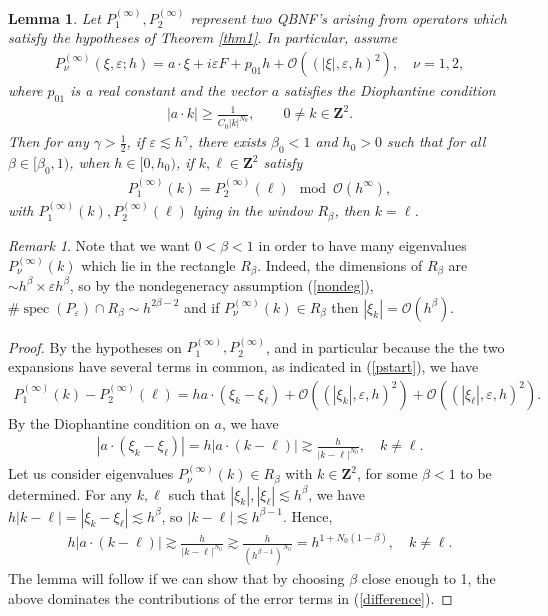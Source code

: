 \documentclass[12pt,lettersize]{article}
\DeclareMathOperator{\spec}{spec}
\renewcommand{\epsilon}{\varepsilon}
\theoremstyle{plain}%
\newtheorem{lemma}[theorem]{Lemma}
\numberwithin{theorem}{section}
\numberwithin{equation}{section}
\theoremstyle{definition}
\theoremstyle{remark}
\newtheorem{remark}[theorem]{Remark}
\begin{document}
{\begin{lemma}\label{lemma}
Let $P^{(\infty)}_1,P^{(\infty)}_2$ represent two QBNF's arising from operators which satisfy the hypotheses of Theorem \ref{thm1}. In particular, assume 
%
\begin{align}\label{pstart}
P^{(\infty)}_\nu(\xi,\epsilon;h) = a\cdot \xi + i\epsilon F + p_{01}h + \mathcal{O}((|\xi|,\epsilon,h)^2), \quad \nu = 1,2,
\end{align}
%
where $p_{01}$ is a real constant and the vector $a$ satisfies the Diophantine condition
%
\begin{align*}{}
|a\cdot k| \geq \frac{1}{C_0|k|^{N_0}}, \qquad 0 \neq k \in \mathbf{Z}^2.
\end{align*}
%
Then for any $\gamma > \frac{1}{2}$, if $\epsilon \lesssim  h^\gamma$, there exists $\beta_0 < 1$ and $h_0 > 0$ such that for all $\beta \in [\beta_0,1)$, when $h\in [0,h_0)$, if $k,\ell \in \mathbf{Z}^2$ satisfy
%
\begin{align*}
P^{(\infty)}_1(k) = P^{(\infty)}_2(\ell) \mod \mathcal{O}(h^\infty),
\end{align*}
%
with $P^{(\infty)}_1(k),P^{(\infty)}_2(\ell)$ lying in the window $R_\beta$, then $k = \ell$. 
\end{lemma}

\begin{remark}
Note that we want $0 < \beta < 1$ in order to have many eigenvalues $P^{(\infty)}_\nu(k)$ which lie in the rectangle $R_\beta$. Indeed, the dimensions of $R_\beta$ are $\sim h^\beta\times \epsilon h^\beta$, so by the nondegeneracy assumption (\ref{nondeg}),  $\#\spec(P_\epsilon)\cap R_\beta \sim h^{2\beta-2}$ and if $P^{(\infty)}_\nu(k)\in R_\beta$ then $|\xi_k| = \mathcal{O}(h^\beta)$. 
\end{remark}

\begin{proof} By the hypotheses on $P^{(\infty)}_1,P^{(\infty)}_2$, and in particular because the the two expansions have several terms in common, as indicated in (\ref{pstart}), we have
%
\begin{align}\label{difference}
P^{(\infty)}_1(k)-P^{(\infty)}_2(\ell) = ha\cdot(\xi_k-\xi_\ell) + \mathcal{O}((|\xi_k|,\epsilon,h)^2) + \mathcal{O}((|\xi_\ell|,\epsilon,h)^2). 
\end{align}
%
By the Diophantine condition on $a$, we have 
%
\begin{align*}
|a\cdot(\xi_k-\xi_\ell)| = h|a\cdot(k-\ell)| \gtrsim \frac{h}{|k-\ell|^{N_0}}, \quad k\neq \ell. 
\end{align*}
%
Let us consider eigenvalues $P^{(\infty)}_\nu(k)\in R_\beta$ with $k\in \mathbf{Z}^2$, for some $\beta < 1$ to be determined. For any $k,\ell$ such that $|\xi_k|,|\xi_\ell|\lesssim h^\beta$, we have $h|k-\ell| = |\xi_k-\xi_\ell| \lesssim h^\beta$, so $|k-\ell| \lesssim h^{\beta-1}$. Hence, 
%
\begin{align}\label{hence}
h|a\cdot(k-\ell)| \gtrsim  \frac{h}{|k-\ell|^{N_0}} \gtrsim \frac{h}{(h^{\beta-1})^{N_0}} = h^{1+{N_0}(1-\beta)}, \quad k\neq \ell. 
\end{align}
The lemma will follow if we can show that by choosing $\beta$ close enough to 1, the above dominates the contributions of the error terms in (\ref{difference}). 


\end{proof}}
\end{document}
